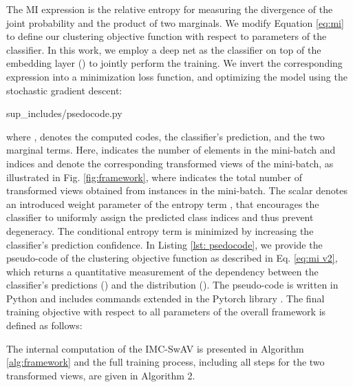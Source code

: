\documentclass[journal]{IEEEtran}
\begin{document}
The MI expression is the relative entropy for measuring the divergence of the joint probability  and the product of two marginals. We modify Equation \ref{eq:mi} to define our clustering objective function with respect to parameters  of the classifier. In this work, we employ a deep net as the classifier  on top of the embedding layer () to jointly perform the training. We invert the corresponding expression into a minimization loss function, and optimizing the model using the stochastic gradient descent:



\begin{lstinputlisting}[language=Python,label={lst: psedocode},float=bp, caption=Pseudo-code written in Python presents the clustering objective based on Pytorch library \cite{NEURIPS2019_9015}.]{sup_includes/psedocode.py}
\end{lstinputlisting}

where ,  denotes the computed codes,  the classifier's prediction,  and  the two marginal terms. Here,  indicates the number of elements in the mini-batch and indices  and  denote the corresponding transformed views of the mini-batch, as illustrated in Fig. \ref{fig:framework}, where  indicates the total number of transformed views obtained from instances in the mini-batch. The scalar  denotes an introduced weight parameter of the entropy term , that  encourages the classifier to uniformly assign the predicted class indices and thus prevent degeneracy. The conditional entropy term is minimized by increasing the classifier's prediction confidence. In Listing \ref{lst: psedocode}, we provide the pseudo-code of the clustering objective function as described in Eq. \ref{eq:mi v2}, which returns a quantitative measurement of the dependency between the classifier's predictions () and the distribution (). The pseudo-code is written in Python and includes commands extended in the Pytorch library \cite{NEURIPS2019_9015}. The final training objective with respect to all parameters of the overall framework  is defined as follows: 

The internal computation of the IMC-SwAV is presented in Algorithm \ref{alg:framework} and the full training process, including all steps for the two transformed views, are given in Algorithm 2.



\end{document}
